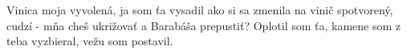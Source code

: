 Vinica moja vyvolená, ja som ťa vysadil
\versseparator
ako si sa zmenila na vinič spotvorený, cudzí - mňa cheš ukrižovať a Barabáša prepustiť?
\versseparator
Oplotil som ťa, kamene som z teba vyzbieral, vežu som postavil.